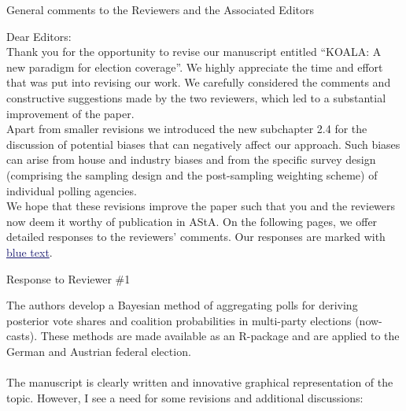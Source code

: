 \documentclass{scrartcl}
\newcommand{\blue}[1]{\textcolor{MidnightBlue}{\underline{\textcolor{MidnightBlue}{#1}}}}
\begin{document}
\begin{center}
\large General comments to the Reviewers and the Associated Editors
\end{center}

\vspace{5ex}

Dear Editors:
\\[2ex]
Thank you for the opportunity to revise our manuscript entitled ``KOALA: A new paradigm for election coverage''. We highly appreciate the time and effort that was put into revising our work. We carefully considered the comments and constructive suggestions made by the two reviewers, which led to
a substantial improvement of the paper.\\

Apart from smaller revisions we introduced the new subchapter 2.4 for the discussion of potential biases that can negatively affect our approach. Such biases can arise from house and industry biases and from the specific survey design (comprising the sampling design and the post-sampling weighting scheme) of individual polling agencies.\\

We hope that these revisions improve the paper such that you and the reviewers now deem it worthy of publication in AStA. On the following pages, we offer detailed responses to the reviewers' comments. Our responses are marked with \blue{blue text}.


\pagebreak
\begin{center}
\large Response to Reviewer \#1
\end{center}
\vspace{5ex}

The authors develop a Bayesian method of aggregating polls for deriving posterior vote shares and coalition probabilities in multi-party elections (now-casts). These methods are made available as an R-package and are applied to the German and Austrian federal election.
\\ \\
The manuscript is clearly written and innovative graphical representation of the topic. However, I see a need for some revisions and additional discussions:
\end{document}
